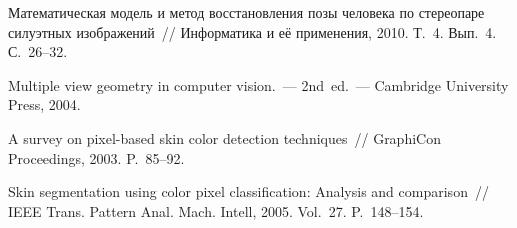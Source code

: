 \begin{multicols}{2}
{{\begin{thebibliography}{99}
 Математическая модель и метод
  восстановления позы человека по стереопаре силуэтных изображений~//
  Информатика и её применения, 2010. Т.~4. Вып.~4. С.~26--32.

 Multiple view geometry in
computer vision.~--- 2nd~ed.~--- Cambridge University Press, 2004.

 A survey on
  pixel-based skin color detection techniques~//  GraphiCon Proceedings,
  2003. P.~85--92.
  
  \label{end\stat}

 Skin segmentation
  using color pixel classification: Analysis and comparison~// IEEE
  Trans. Pattern Anal. Mach. Intell, 2005. Vol.~27.
P.~148--154.
 \end{thebibliography}
}
}


\end{multicols}